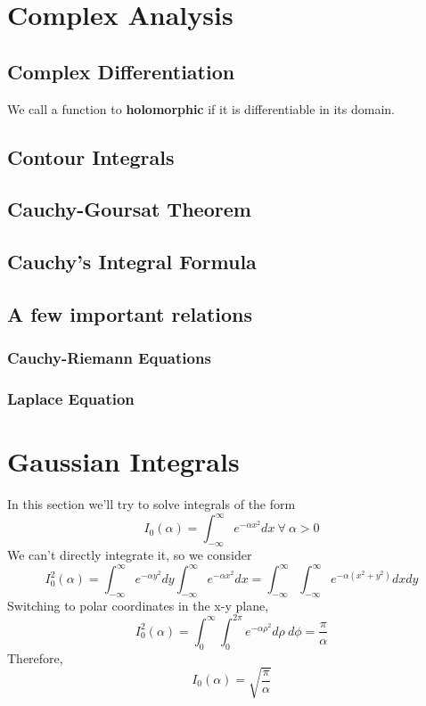 \section{Complex Analysis}
\subsection{Complex Differentiation}
We call a function to \textbf{holomorphic} if it is differentiable in its domain.
\subsection{Contour Integrals}
\subsection{Cauchy-Goursat Theorem}
\subsection{Cauchy's Integral Formula}

\subsection{A few important relations}
\subsubsection{Cauchy-Riemann Equations}
\subsubsection{Laplace Equation}
\section{Gaussian Integrals}
In this section we'll try to solve integrals of the form
\begin{equation}
I_{0} (\alpha) = \int_{-\infty}^{\infty} e^{-\alpha x^{2}} dx \ \forall \ \alpha > 0
\end{equation}
We can't directly integrate it, so we consider
\begin{equation}
I^{2}_{0}(\alpha) = \int_{-\infty}^{\infty} e^{-\alpha y^{2}} dy\int_{-\infty}^{\infty} e^{-\alpha x^{2}} dx = \int_{-\infty}^{\infty}\int_{-\infty}^{\infty}e^{-\alpha (x^{2} + y^{2})} dxdy
\end{equation}
Switching to polar coordinates in the x-y plane,
\begin{equation}
I^{2}_{0}(\alpha) = \int_{0}^{\infty} \int_{0}^{2 \pi} e^{-\alpha \rho^{2}} d \rho \ d\phi = \frac{\pi}{\alpha}
\end{equation}
Therefore,
\begin{equation}
	I_{0}(\alpha) = \sqrt{\frac{\pi}{\alpha}}
\end{equation}
